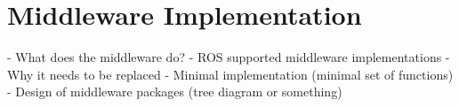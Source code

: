 \chapter{Middleware Implementation}\label{cha:middleware}


- What does the middleware do?
- ROS supported middleware implementations
- Why it needs to be replaced
- Minimal implementation (minimal set of functions)
- Design of middleware packages (tree diagram or something)